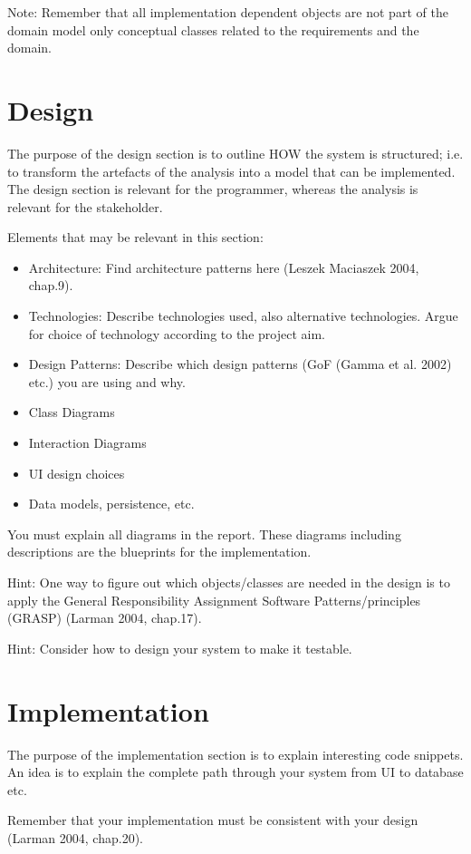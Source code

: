 \documentclass{article}
\begin{document}
	Note: Remember that all implementation dependent objects are not part of the domain model only conceptual classes related to the requirements and the domain. 
	\newpage
	\section{Design}
	The purpose of the design section is to outline HOW the system is structured; i.e. to transform the artefacts of the analysis into a model that can be implemented. The design section is relevant for the programmer, whereas the analysis is relevant for the stakeholder.
	
	Elements that may be relevant in this section:
	\begin{itemize}
		\item Architecture: Find architecture patterns here (Leszek Maciaszek 2004, chap.9).
		\item Technologies: Describe technologies used, also alternative technologies. Argue for choice of technology according to the project aim.
		\item Design Patterns: Describe which design patterns (GoF (Gamma et al. 2002) etc.) you are using and why.
		\item Class Diagrams
		\item Interaction Diagrams
		\item UI design choices
		\item Data models, persistence, etc.
	\end{itemize}
	
	You must explain all diagrams in the report. These diagrams including descriptions are the blueprints for the implementation.
	
	Hint: One way to figure out which objects/classes are needed in the design is to apply the General Responsibility Assignment Software Patterns/principles (GRASP) (Larman 2004, chap.17).
	
	Hint: Consider how to design your system to make it testable.
	
	\newpage
	\section{Implementation}
	The purpose of the implementation section is to explain interesting code snippets. An idea is to explain the complete path through your system from UI to database etc.
	
	Remember that your implementation must be consistent with your design (Larman 2004, chap.20).
	
\end{document}

